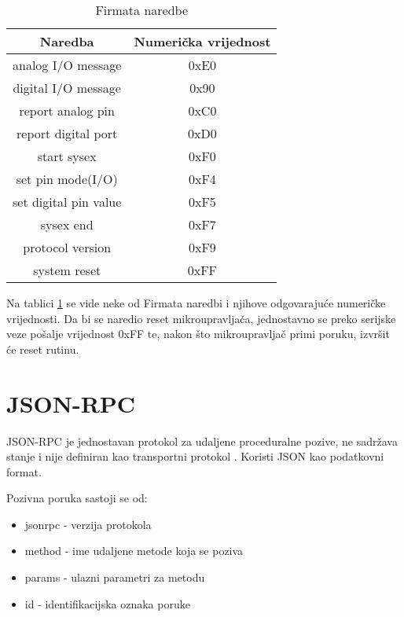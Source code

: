 \begin{table}[h]
\setlength{\tabcolsep}{18pt}
\centering
    \begin{tabular}{|c|c|}
        \hline
        Naredba               & Numerička vrijednost \\
        \hline
        analog I/O message    & 0xE0 \\
        \hline
        digital I/O message   & 0x90 \\
        \hline
        report analog pin     & 0xC0 \\
        \hline
        report digital port   & 0xD0 \\
        \hline
        start sysex           & 0xF0 \\
        \hline
        set pin mode(I/O)     & 0xF4 \\
        \hline
        set digital pin value & 0xF5 \\
        \hline
        sysex end             & 0xF7 \\
        \hline
        protocol version      & 0xF9 \\
        \hline
        system reset          & 0xFF \\
        \hline
    \end{tabular}
    \caption{Firmata naredbe}
    \label{tbl:firmata}
\end{table}

Na tablici \ref{tbl:firmata} se vide neke od Firmata naredbi i njihove
odgovarajuće numeričke vrijednosti. Da bi se naredio reset mikroupravljača,
jednostavno se preko serijske veze pošalje vrijednost 0xFF te, nakon što
mikroupravljač primi poruku, izvršit će reset rutinu.

\newpage
\section{JSON-RPC}

JSON-RPC je jednostavan protokol za udaljene proceduralne pozive, ne sadržava
stanje i nije definiran kao transportni protokol \cite{jsonRPC}. Koristi JSON
\cite{jsonRFC} kao podatkovni format.

Pozivna poruka sastoji se od:
\begin{itemize}
        \item jsonrpc - verzija protokola
        \item method - ime udaljene metode koja se poziva
        \item params - ulazni parametri za metodu
        \item id - identifikacijska oznaka poruke
\end{itemize}

